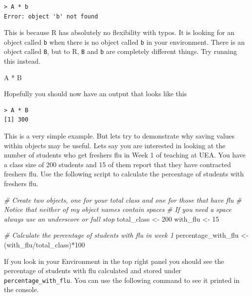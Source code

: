 \documentclass[
]{book}
\newenvironment{Shaded}{\begin{snugshade}}{\end{snugshade}}
\newcommand{\CommentTok}[1]{\textcolor[rgb]{0.56,0.35,0.01}{\textit{#1}}}
\newcommand{\DecValTok}[1]{\textcolor[rgb]{0.00,0.00,0.81}{#1}}
\newcommand{\NormalTok}[1]{#1}
\newcommand{\OtherTok}[1]{\textcolor[rgb]{0.56,0.35,0.01}{#1}}
\newcommand{\SpecialCharTok}[1]{\textcolor[rgb]{0.00,0.00,0.00}{#1}}
\begin{document}
\begin{verbatim}
> A * b
Error: object 'b' not found
\end{verbatim}

This is because R has absolutely no flexibility with typos. It is looking for an object called \texttt{b} when there is no object called \texttt{b} in your environment. There is an object called \texttt{B}, but to R, \texttt{B} and \texttt{b} are completely different things. Try running this instead.

\begin{Shaded}
\begin{Highlighting}[]
\NormalTok{A }\SpecialCharTok{*}\NormalTok{ B}
\end{Highlighting}
\end{Shaded}

Hopefully you should now have an output that looks like this

\begin{verbatim}
> A * B
[1] 300
\end{verbatim}

This is a very simple example. But lets try to demonstrate why saving values within objects may be useful. Lets say you are interested in looking at the number of students who get freshers flu in Week 1 of teaching at UEA. You have a class size of 200 students and 15 of them report that they have contracted freshers flu. Use the following script to calculate the percentage of students with freshers flu.

\begin{Shaded}
\begin{Highlighting}[]
\CommentTok{\# Create two objects, one for your total class and one for those that have flu}
\CommentTok{\# Notice that neither of my object names contain spaces}
\CommentTok{\# If you need a space always use an underscore or full stop}
\NormalTok{total\_class }\OtherTok{\textless{}{-}} \DecValTok{200}
\NormalTok{with\_flu }\OtherTok{\textless{}{-}} \DecValTok{15}

\CommentTok{\# Calculate the percentage of students with flu in week 1}
\NormalTok{percentage\_with\_flu }\OtherTok{\textless{}{-}}\NormalTok{ (with\_flu}\SpecialCharTok{/}\NormalTok{total\_class)}\SpecialCharTok{*}\DecValTok{100}
\end{Highlighting}
\end{Shaded}

If you look in your Environment in the top right panel you should see the percentage of students with flu calculated and stored under \texttt{percentage\_with\_flu}. You can use the following command to see it printed in the console.
\end{document}
